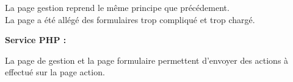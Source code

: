 			\begin{paragraphe}
                La page gestion reprend le même principe que précédement. \\
                La page a été allégé des formulaires trop compliqué et trop chargé.
			\end{paragraphe}

			\begin{paragraphe}
				\textbf{Service PHP :}
			\end{paragraphe}
            
            \begin{paragraphe}
                La page de gestion et la page formulaire permettent d'envoyer des actions à effectué sur la page action.
			\end{paragraphe}
            

